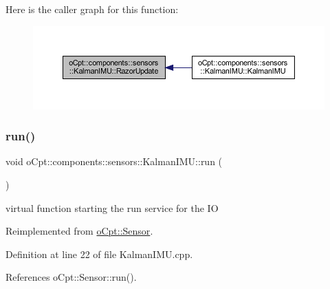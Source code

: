 Here is the caller graph for this function\+:
\nopagebreak
\begin{figure}[H]
\begin{center}
\leavevmode
\includegraphics[width=350pt]{classo_cpt_1_1components_1_1sensors_1_1_kalman_i_m_u_a99b62a459b69b3b877d98dcb34b286d7_icgraph}
\end{center}
\end{figure}
\hypertarget{classo_cpt_1_1components_1_1sensors_1_1_kalman_i_m_u_abd725cf96ffa29379c496bed243a520a}{}\label{classo_cpt_1_1components_1_1sensors_1_1_kalman_i_m_u_abd725cf96ffa29379c496bed243a520a} 
\subsubsection{\texorpdfstring{run()}{run()}}
{\footnotesize\ttfamily void o\+Cpt\+::components\+::sensors\+::\+Kalman\+I\+M\+U\+::run (\begin{DoxyParamCaption}{ }\end{DoxyParamCaption})\hspace{0.3cm}{\ttfamily [virtual]}}

virtual function starting the run service for the IO 

Reimplemented from \hyperlink{classo_cpt_1_1_sensor_aef25b0e5f3a8358ee81c97c73909fbe6}{o\+Cpt\+::\+Sensor}.



Definition at line 22 of file Kalman\+I\+M\+U.\+cpp.



References o\+Cpt\+::\+Sensor\+::run().

